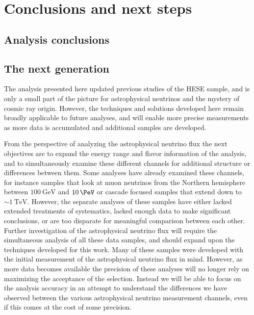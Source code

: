 \chapter{Conclusions and next steps\label{chapter:conclusions}}
\section{Analysis conclusions\label{sec:analysis_conclusions}}
\begingroup
\graphicspath{{results/HESE_Final_Paper/}}

\endgroup
\FloatBarrier

\section{The next generation}
The analysis presented here updated previous studies of the HESE sample, and is only a small part of the picture for astrophysical neutrinos and the mystery of cosmic ray origin.
However, the techniques and solutions developed here remain broadly applicable to future analyses, and will enable more precise measurements as more data is accumulated and additional samples are developed.

From the perspective of analyzing the astrophysical neutrino flux the next objectives are to expand the energy range and flavor information of the analysis, and to simultaneously examine these different channels for additional structure or differences between them.
Some analyses have already examined these channels, for instance samples that look at muon neutrinos from the Northern hemisphere between $\SI{100}\GeV$ and $\SI{10}\PeV$ or cascade focused samples that extend down to $\sim\SI{1}\TeV$.
However, the separate analyses of these samples have either lacked extended treatments of systematics, lacked enough data to make significant conclusions, or are too disparate for meaningful comparison between each other.
Further investigation of the astrophysical neutrino flux will require the simultaneous analysis of all these data samples, and should expand upon the techniques developed for this work.
Many of these samples were developed with the initial measurement of the astrophysical neutrino flux in mind.
However, as more data becomes available the precision of these analyses will no longer rely on maximizing the acceptance of the selection.
Instead we will be able to focus on the analysis accuracy in an attempt to understand the differences we have observed between the various astrophysical neutrino measurement channels, even if this comes at the cost of some precision.

